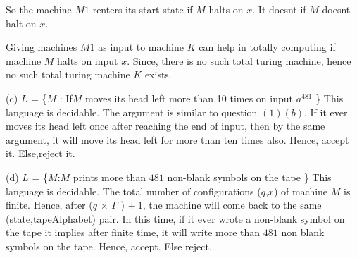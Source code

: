 \documentclass[addpoints,12pt]{exam}
\begin{document}
\begin{questions}
\begin{itemize}
	\end{itemize}
	So the machine $M1$ renters its start state if $M$ halts on $x$. It doesnt if $M$ doesnt halt on $x$.

      Giving machines $M1$ as input to machine $K$ can help in totally computing if machine $M$ halts on input $x$. Since, there is no such total turing machine, hence no such total turing machine $K$ exists.
      \newline
      
      (c) \quad $L$ = \{$M$ : If$M$ moves its head left more than 10 times on input $a^{481}$ \} \newline
	This language is decidable. The argument is similar to question $(1)(b)$. If it ever moves its head left once after reaching the end of input, then
	by the same argument, it will move its head left for more than ten times also. Hence, accept it. Else,reject it.
	\newline
	
      (d) \quad $L$ = \{$M$:$M$ prints more than $481$ non-blank symbols on the tape \} \newline
      This language is decidable. The total number of configurations ($q$,$x$) of machine $M$ is finite. Hence, after (\textbar $q$ \textbar $\times$ \textbar $\Gamma$ \textbar) $+~1$, the machine
      will come back to the same (state,tapeAlphabet) pair. In this time, if it ever wrote a non-blank symbol on the tape it implies after finite time, it will write more than $481$ non blank symbols on the tape.
      Hence, accept. Else reject.
      \newline
      
 \question
\end{questions}
\end{document}
